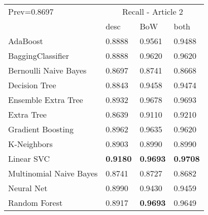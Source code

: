 \begin{tabular}{|l|l|l|l| }
\hline
Prev=0.8697 &  \multicolumn{3}{c|}{Recall - Article 2} \\
\cline{2-4} & desc & BoW & both \\ \hline
AdaBoost                & 0.8888 & 0.9561 & 0.9488\\
BaggingClassifier       & 0.8888 & 0.9620 & 0.9620\\
Bernoulli Naive Bayes   & 0.8697 & 0.8741 & 0.8668\\
Decision Tree           & 0.8843 & 0.9458 & 0.9474\\
Ensemble Extra Tree     & 0.8932 & 0.9678 & 0.9693\\
Extra Tree              & 0.8639 & 0.9110 & 0.9210\\
Gradient Boosting       & 0.8962 & 0.9635 & 0.9620\\
K-Neighbors             & 0.8903 & 0.8990 & 0.8990\\
Linear SVC              & {\bf 0.9180} & {\bf 0.9693} & {\bf 0.9708}\\
Multinomial Naive Bayes & 0.8741 & 0.8727 & 0.8682\\
Neural Net              & 0.8990 & 0.9430 & 0.9459\\
Random Forest           & 0.8917 & {\bf 0.9693} & 0.9649\\
\hline
\end{tabular}